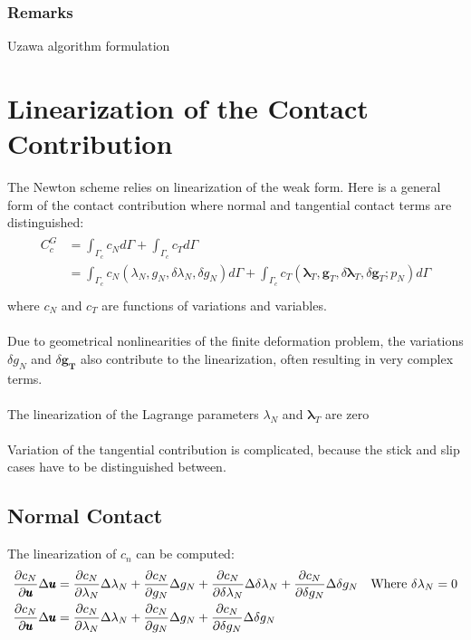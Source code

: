 \documentclass[12pt,3p]{article}
\numberwithin{equation}{section}
\begin{document}
\subsubsection{Remarks}
Uzawa algorithm formulation

\section{Linearization of the Contact Contribution}
The Newton scheme relies on linearization of the weak form. Here is a general form of the contact contribution where normal and tangential contact terms are distinguished: 
\begin{align}\label{6113}
\begin{split}
C_c^G &= \int_{\Gamma_c} c_N d \Gamma + \int_{\Gamma_c} c_T d \Gamma \\
	&= \int_{\Gamma_c} c_N (\lambda_N, g_N, \delta \lambda_N, \delta g_N) d \Gamma + \int_{\Gamma_c} c_T (\pmb{\lambda}_T, \pmb{g}_T, \delta \pmb{\lambda}_T, \delta \pmb{g}_T; p_N)d \Gamma \\
\end{split}
\end{align}
where $c_N$ and $c_T$ are functions of variations and variables. \\ \\
Due to geometrical nonlinearities of the finite deformation problem, the variations $\delta g_N$ and $\delta \pmb{g_T}$ also contribute to the linearization, often resulting in very complex terms. \\ \\
The linearization of the Lagrange parameters $\lambda_N$ and $\pmb{\lambda}_T$ are zero \\ \\
Variation of the tangential contribution is complicated, because the stick and slip cases have to be distinguished between. 

\subsection{Normal Contact}
The linearization of $c_n$ can be computed: 
\begin{align}\label{6114}
\begin{split}
\pdv{c_N}{\pmb{u}} \Delta \pmb{u} &= \pdv{c_N}{\lambda_N} \Delta \lambda_N + \pdv{c_N}{g_N} \Delta g_N + \pdv{c_N}{\delta \lambda_N} \Delta \delta \lambda_N + \pdv{c_N}{\delta g_N} \Delta \delta g_N \quad \text{Where } \delta \lambda_N = 0 \\
\pdv{c_N}{\pmb{u}} \Delta \pmb{u} &= \pdv{c_N}{\lambda_N} \Delta \lambda_N + \pdv{c_N}{g_N} \Delta g_N + \pdv{c_N}{\delta g_N} \Delta \delta g_N 
\end{split}
\end{align}
\end{document}
